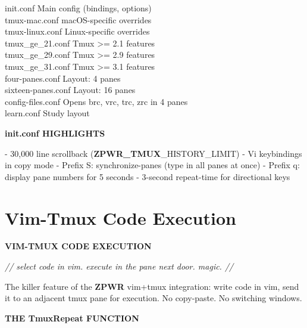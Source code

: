 \documentclass[11pt,a4paper,twoside]{book}
\begin{document}
\begin{codebox}
\color{neongreen}init.conf               Main config (bindings, options)\\
\color{neongreen}tmux-mac.conf           macOS-specific overrides\\
\color{neongreen}tmux-linux.conf         Linux-specific overrides\\
\color{neongreen}tmux\_ge\_21.conf         Tmux >= 2.1 features\\
\color{neongreen}tmux\_ge\_29.conf         Tmux >= 2.9 features\\
\color{neongreen}tmux\_ge\_31.conf         Tmux >= 3.1 features\\
\color{neongreen}four-panes.conf         Layout: 4 panes\\
\color{neongreen}sixteen-panes.conf      Layout: 16 panes\\
\color{neongreen}config-files.conf       Opens brc, vrc, trc, zrc in 4 panes\\
\color{neongreen}learn.conf              Study layout\\
\end{codebox}


\vspace{12pt}
{\bfseries\color{neonyellow} init.conf HIGHLIGHTS}\vspace{4pt}

- 30,000 line scrollback (\textbf{ZPWR\_TMUX}\_HISTORY\_LIMIT) - Vi keybindings in copy mode - Prefix S: synchronize-panes (type in all panes at once) - Prefix q: display pane numbers for 5 seconds - 3-second repeat-time for directional keys


\vspace{16pt}

\section{Vim-Tmux Code Execution}


\vspace{10pt}
{\large\bfseries\color{neoncyan} VIM-TMUX CODE EXECUTION}\vspace{6pt}

{\small\itshape\color{dimtext} // select code in vim. execute in the pane next door. magic. //}

The killer feature of the \textbf{ZPWR} vim+tmux integration: write code in vim, send it to an adjacent tmux pane for execution. No copy-paste. No switching windows.


\vspace{12pt}
{\bfseries\color{neonyellow} THE TmuxRepeat FUNCTION}\vspace{4pt}
\end{document}
